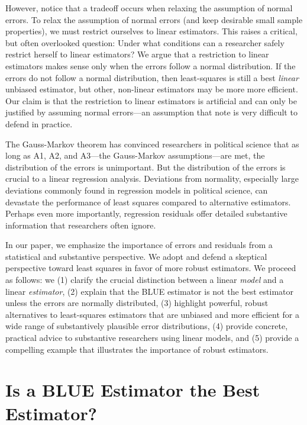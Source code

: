 \documentclass[12pt]{article}
\begin{document}
However, notice that a tradeoff occurs when relaxing the assumption of normal errors. 
To relax the assumption of normal errors (and keep desirable small sample properties), we must restrict ourselves to linear estimators. 
This raises a critical, but often overlooked question: Under what conditions can a researcher safely restrict herself to linear estimators? 
We argue that a restriction to linear estimators makes sense only when the errors follow a normal distribution. 
If the errors do not follow a normal distribution, then least-squares is still a best \textit{linear} unbiased estimator, but other, non-linear estimators may be more more efficient.
Our claim is that the restriction to linear estimators is artificial and can only be justified by assuming normal errors---an assumption that \cite{BerryFeldman1985} note is very difficult to defend in practice.

The Gauss-Markov theorem has convinced researchers in political science that as long as A1, A2, and A3---the Gauss-Markov assumptions---are met, the distribution of the errors is unimportant. 
But the distribution of the errors is crucial to a linear regression analysis.
Deviations from normality, especially large deviations commonly found in regression models in political science, can devastate the performance of least squares compared to alternative estimators. Perhaps even more importantly, regression residuals offer detailed substantive information that researchers often ignore.

In our paper, we emphasize the importance of errors and residuals from a statistical and substantive perspective. We adopt and defend a skeptical perspective toward least squares in favor of more robust estimators. We proceed as follows: we (1) clarify the crucial distinction between a linear \textit{model} and a linear \textit{estimator}, (2) explain that the BLUE estimator is not the best estimator unless the errors are normally distributed, (3) highlight powerful, robust alternatives to least-squares estimators that are unbiased and more efficient for a wide range of substantively plausible error distributions, (4) provide concrete, practical advice to substantive researchers using linear models, and (5) provide a compelling example that illustrates the importance of robust estimators.

\section*{Is a BLUE Estimator the Best Estimator?}
\end{document}
